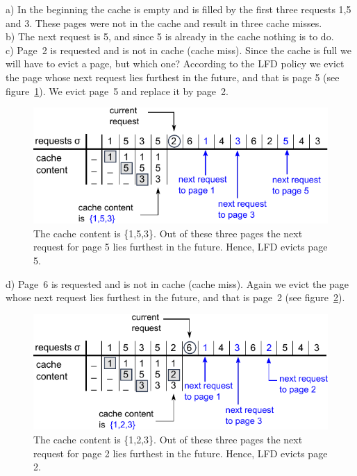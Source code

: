 \documentclass[a4paper,12pt, titlepage]{article}  %
\begin{document}
\noindent a) In the beginning the cache is empty and is filled by the first three requests 1,5 and 3.
These pages were not in the cache and result in three cache misses.\\
b) The next request is 5, and since 5 is already in the cache nothing is to do. \\
c) Page~2 is requested and is not in cache (cache miss). Since the cache is full we will 
have to evict a page, but which one? According to the LFD policy we evict the page 
whose next request lies furthest in the future, and that is page 5 (see figure~\ref{fig:LFD_example_c}). We evict page~5 and replace it by page~2.

\begin{figure}[h]
	\centering
	\includegraphics{./figures/LFD_example_c.pdf}
	\caption{The cache content is \{1,5,3\}. Out of these three pages
	         the next request for page 5 lies furthest in the future. Hence, LFD evicts page 5.}
	\label{fig:LFD_example_c}
\end{figure}

\noindent d) Page~6 is requested and is not in cache (cache miss). Again we evict the page 
whose next request lies furthest in the future, and that is page~2 (see figure~\ref{fig:LFD_example_d}). 

\begin{figure}[h]
	\centering
	\includegraphics{./figures/LFD_example_d.pdf}
	\caption{The cache content is \{1,2,3\}. Out of these three pages
	         the next request for page 2 lies furthest in the future. Hence, LFD evicts page 2.}
	\label{fig:LFD_example_d}
\end{figure}
\end{document}
